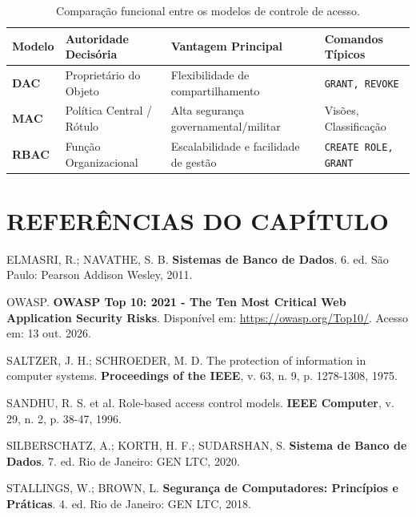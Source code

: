 \begin{table}[h!]
\centering
\small
\begin{tabular}{|l|l|p{4.5cm}|l|}
\hline
\textbf{Modelo} & \textbf{Autoridade Decisória} & \textbf{Vantagem Principal} & \textbf{Comandos Típicos} \\ \hline
\textbf{DAC} & Proprietário do Objeto & Flexibilidade de compartilhamento & \texttt{GRANT, REVOKE} \\ \hline
\textbf{MAC} & Política Central / Rótulo & Alta segurança governamental/militar & Visões, Classificação \\ \hline
\textbf{RBAC} & Função Organizacional & Escalabilidade e facilidade de gestão & \texttt{CREATE ROLE, GRANT} \\ \hline
\end{tabular}
\caption{Comparação funcional entre os modelos de controle de acesso.}
\end{table}

\section*{REFERÊNCIAS DO CAPÍTULO}

\noindent ELMASRI, R.; NAVATHE, S. B. \textbf{Sistemas de Banco de Dados}. 6. ed. São Paulo: Pearson Addison Wesley, 2011.

\vspace{0.8em}
\noindent OWASP. \textbf{OWASP Top 10: 2021 - The Ten Most Critical Web Application Security Risks}. Disponível em: \url{https://owasp.org/Top10/}. Acesso em: 13 out. 2026.

\vspace{0.8em}
\noindent SALTZER, J. H.; SCHROEDER, M. D. The protection of information in computer systems. \textbf{Proceedings of the IEEE}, v. 63, n. 9, p. 1278-1308, 1975.

\vspace{0.8em}
\noindent SANDHU, R. S. et al. Role-based access control models. \textbf{IEEE Computer}, v. 29, n. 2, p. 38-47, 1996.

\vspace{0.8em}
\noindent SILBERSCHATZ, A.; KORTH, H. F.; SUDARSHAN, S. \textbf{Sistema de Banco de Dados}. 7. ed. Rio de Janeiro: GEN LTC, 2020.

\vspace{0.8em}
\noindent STALLINGS, W.; BROWN, L. \textbf{Segurança de Computadores: Princípios e Práticas}. 4. ed. Rio de Janeiro: GEN LTC, 2018.
